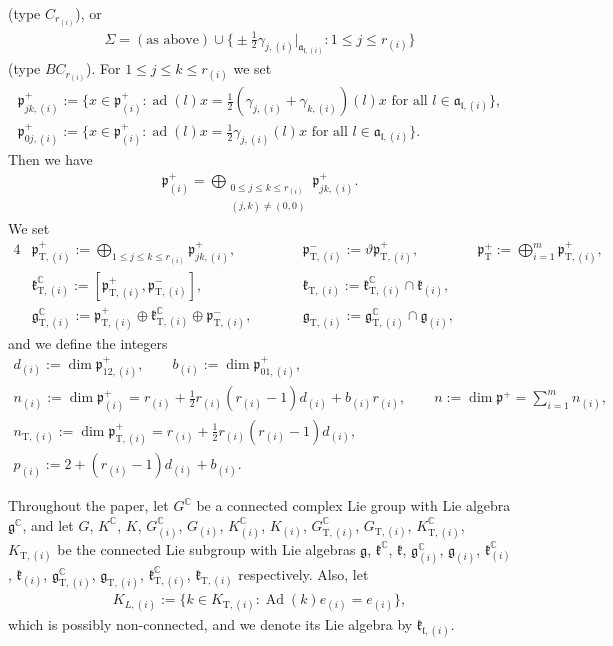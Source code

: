 \documentclass[pdftex]{sigma}
\numberwithin{equation}{section}
\newcommand{\BC}{\mathbb{C}}
\newcommand{\fa}{\mathfrak{a}}
\newcommand{\fg}{\mathfrak{g}}
\newcommand{\fk}{\mathfrak{k}}
\newcommand{\fl}{\mathfrak{l}}
\newcommand{\fp}{\mathfrak{p}}
\newcommand{\rT}{\mathrm{T}}
\begin{document}
(type $C_{r_{(i)}}$), or
\begin{gather*} \Sigma=(\text{as above})\cup\big\{ {\pm}\tfrac{1}{2}\gamma_{j,(i)}\big|_{\fa_{\fl,(i)}}\colon 1\le j\le r_{(i)}\big\} \end{gather*}
(type $BC_{r_{(i)}}$). For $1\le j\le k\le r_{(i)}$ we set
\begin{gather*}
\fp^+_{jk,(i)} :=\big\{x\in\fp^+_{(i)}\colon \operatorname{ad}(l)x=\tfrac{1}{2}(\gamma_{j,(i)}+\gamma_{k,(i)})(l)x\text{ for all }l\in\fa_{\fl,(i)}\big\},\\
\fp^+_{0j,(i)} :=\big\{x\in\fp^+_{(i)}\colon \operatorname{ad}(l)x=\tfrac{1}{2}\gamma_{j,(i)}(l)x\text{ for all } l\in\fa_{\fl,(i)}\big\}.
\end{gather*}
Then we have
\begin{gather*} \fp^+_{(i)}=\bigoplus_{\substack{0\le j\le k\le r_{(i)}\\ (j,k)\ne (0,0)}}\fp^+_{jk,(i)}. \end{gather*}
We set
\begin{alignat*}{4}
&\fp^+_{\rT,(i)}:=\bigoplus_{1\le j\le k\le r_{(i)}}\fp^+_{jk,(i)},\qquad &&
\fp^-_{\rT,(i)}:=\vartheta\fp^+_{\rT,(i)},\qquad &&
\fp^+_{\rT}:=\bigoplus_{i=1}^m \fp^+_{\rT,(i)}, &\\
&\fk^\BC_{\rT,(i)}:=[\fp^+_{\rT,(i)},\fp^-_{\rT,(i)}], \qquad && \fk_{\rT,(i)} :=\fk^\BC_{\rT,(i)}\cap \fk_{(i)}, &&&\\
& \fg^\BC_{\rT,(i)}:=\fp^+_{\rT,(i)}\oplus \fk^\BC_{\rT,(i)}\oplus \fp^-_{\rT,(i)},\qquad && \fg_{\rT,(i)}:=\fg^\BC_{\rT,(i)}\cap \fg_{(i)},&&&
\end{alignat*}
and we define the integers
\begin{gather*}
d_{(i)} :=\dim\fp^+_{12,(i)},\qquad b_{(i)}:=\dim\fp^+_{01,(i)},\\
n_{(i)}:=\dim\fp^+_{(i)}=r_{(i)}+\tfrac{1}{2}r_{(i)}(r_{(i)}-1)d_{(i)}+b_{(i)}r_{(i)},\qquad
n:=\dim\fp^+=\sum_{i=1}^m n_{(i)},\\
n_{\rT,(i)}:=\dim\fp^+_{\rT,(i)}=r_{(i)}+\tfrac{1}{2}r_{(i)}(r_{(i)}-1)d_{(i)},\\
p_{(i)}:=2+(r_{(i)}-1)d_{(i)}+b_{(i)}.
\end{gather*}

Throughout the paper, let $G^\BC$ be a connected complex Lie group with Lie algebra $\fg^\BC$, and let
$G$, $K^\BC$, $K$, $G^\BC_{(i)}$, $G_{(i)}$, $K^\BC_{(i)}$, $K_{(i)}$, $G^\BC_{\rT,(i)}$, $G_{\rT,(i)}$, $K^\BC_{\rT,(i)}$, $K_{\rT,(i)}$
be the connected Lie subgroup with Lie algebras
$\fg$, $\fk^\BC$, $\fk$, $\fg^\BC_{(i)}$, $\fg_{(i)}$, $\fk^\BC_{(i)}$, $\fk_{(i)}$,
$\fg^\BC_{\rT,(i)}$, $\fg_{\rT,(i)}$, $\fk^\BC_{\rT,(i)}$, $\fk_{\rT,(i)}$ respectively.
Also, let
\begin{gather*} K_{L,(i)}:=\big\{ k\in K_{\rT,(i)}\colon \operatorname{Ad}(k)e_{(i)}=e_{(i)}\big\}, \end{gather*}
which is possibly non-connected, and we denote its Lie algebra by $\fk_{\fl,(i)}$.
\end{document}
